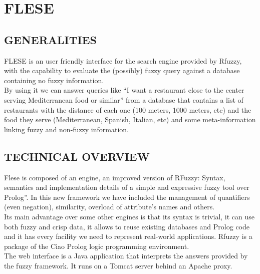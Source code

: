 \documentclass[a4paper,twoside]{article}
\begin{document}

\section{\uppercase{\uppercase{Flese}}}

\subsection{\uppercase{Generalities}}

FLESE is an user friendly interface for the search engine provided by Rfuzzy, with the capability to evaluate the (possibly) fuzzy query against a database containing no fuzzy information.\\

By using it we can answer queries like “I want a restaurant close to the center serving Mediterranean food or similar” from a database that contains a list of restaurants with the distance of each one (100 meters, 1000 meters, etc) and the food they serve (Mediterranean, Spanish, Italian, etc) and some meta-information linking fuzzy and non-fuzzy information.

\subsection{\uppercase{Technical overview}}

Flese is composed of an engine, an improved version of RFuzzy: Syntax, semantics and implementation details of a simple and expressive fuzzy tool over Prolog”. In this new framework we have included the management of quantifiers (even negation), similarity, overload of attribute's names and others. \\

Its main advantage over some other engines is that its syntax is trivial, it can use both fuzzy and crisp data, it allows to reuse existing databases and Prolog code and it has every facility we need to represent real-world applications. Rfuzzy is a package of the Ciao Prolog logic programming environment.  \\

The web interface is a Java application that interprets the answers provided by the fuzzy framework. It runs on a Tomcat server behind an Apache proxy.  \\
\end{document}
